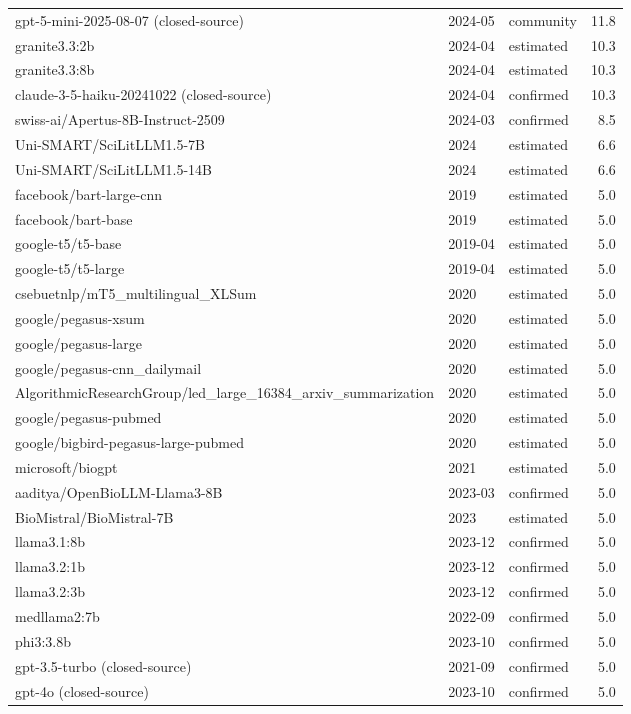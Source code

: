 \documentclass[12pt,letterpaper]{article}
\renewenvironment{table*}{\begin{table}}{\end{table}}
\begin{document}
\begin{table}[!htbp]
\begin{tabularx}{\linewidth}{X l l r}
gpt-5-mini-2025-08-07 (closed-source) & 2024-05 & community & 11.8 \\
granite3.3:2b & 2024-04 & estimated & 10.3 \\
granite3.3:8b & 2024-04 & estimated & 10.3 \\
claude-3-5-haiku-20241022 (closed-source) & 2024-04 & confirmed & 10.3 \\
swiss-ai/Apertus-8B-Instruct-2509 & 2024-03 & confirmed & 8.5 \\
Uni-SMART/SciLitLLM1.5-7B & 2024 & estimated & 6.6 \\
Uni-SMART/SciLitLLM1.5-14B & 2024 & estimated & 6.6 \\
facebook/bart-large-cnn & 2019 & estimated & 5.0 \\
facebook/bart-base & 2019 & estimated & 5.0 \\
google-t5/t5-base & 2019-04 & estimated & 5.0 \\
google-t5/t5-large & 2019-04 & estimated & 5.0 \\
csebuetnlp/mT5\_multilingual\_XLSum & 2020 & estimated & 5.0 \\
google/pegasus-xsum & 2020 & estimated & 5.0 \\
google/pegasus-large & 2020 & estimated & 5.0 \\
google/pegasus-cnn\_dailymail & 2020 & estimated & 5.0 \\
AlgorithmicResearchGroup/led\_large\_16384\_arxiv\_summarization & 2020 & estimated & 5.0 \\
google/pegasus-pubmed & 2020 & estimated & 5.0 \\
google/bigbird-pegasus-large-pubmed & 2020 & estimated & 5.0 \\
microsoft/biogpt & 2021 & estimated & 5.0 \\
aaditya/OpenBioLLM-Llama3-8B & 2023-03 & confirmed & 5.0 \\
BioMistral/BioMistral-7B & 2023 & estimated & 5.0 \\
llama3.1:8b & 2023-12 & confirmed & 5.0 \\
llama3.2:1b & 2023-12 & confirmed & 5.0 \\
llama3.2:3b & 2023-12 & confirmed & 5.0 \\
medllama2:7b & 2022-09 & confirmed & 5.0 \\
phi3:3.8b & 2023-10 & confirmed & 5.0 \\
gpt-3.5-turbo (closed-source) & 2021-09 & confirmed & 5.0 \\
gpt-4o (closed-source) & 2023-10 & confirmed & 5.0 \\

\end{tabularx}
\end{table}
\end{document}

